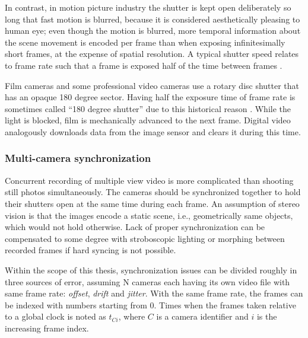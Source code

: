 In contrast, in motion picture industry the shutter is kept open deliberately so long that fast motion is blurred, because it is considered aesthetically pleasing to human eye;
even though the motion is blurred, more temporal information about the scene movement is encoded per frame than when exposing infinitesimally short frames, at the expense of spatial resolution.
A typical shutter speed relates to frame rate such that a frame is exposed half of the time between frames \cite{wilson2004anton}.

Film cameras and some professional video cameras use a rotary disc shutter that has an opaque 180 degree sector.
Having half the exposure time of frame rate is sometimes called ``180 degree shutter'' due to this historical reason \cite{wilson2004anton}.
While the light is blocked, film is mechanically advanced to the next frame.
Digital video analogously downloads data from the image sensor and clears it during this time.



\subsubsection{Multi-camera synchronization} %


Concurrent recording of multiple view video is more complicated than shooting still photos simultaneously.
The cameras should be synchronized together to hold their shutters open at the same time during each frame.
An assumption of stereo vision is that the images encode a static scene, i.e., geometrically same objects, which would not hold otherwise.
Lack of proper synchronization can be compensated to some degree with stroboscopic lighting or morphing between recorded frames if hard syncing is not possible. \cite{bradley2009synchronization}

Within the scope of this thesis, synchronization issues can be divided roughly in three sources of error, assuming N cameras each having its own video file with same frame rate: \emph{offset}, \emph{drift} and \emph{jitter}.
With the same frame rate, the frames can be indexed with numbers starting from 0.
Times when the frames taken relative to a global clock is noted as $t_{Ci}$, where $C$ is a camera identifier and $i$ is the increasing frame index.

